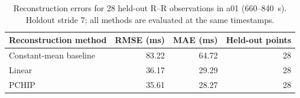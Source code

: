 \begin{table}[htbp]
\centering
\begin{tabular}{lrrr}
\toprule
Reconstruction method & RMSE (ms) & MAE (ms) & Held-out points \\
\midrule
Constant-mean baseline & 83.22 & 64.72 & 28 \\
Linear & 36.17 & 29.29 & 28 \\
PCHIP & 35.61 & 28.27 & 28 \\
\bottomrule
\end{tabular}
\caption{Reconstruction errors for 28 held-out R--R observations in a01 (660--840~s). Holdout stride 7; all methods are evaluated at the same timestamps.}

\label{tab:interpolation}
\end{table}
